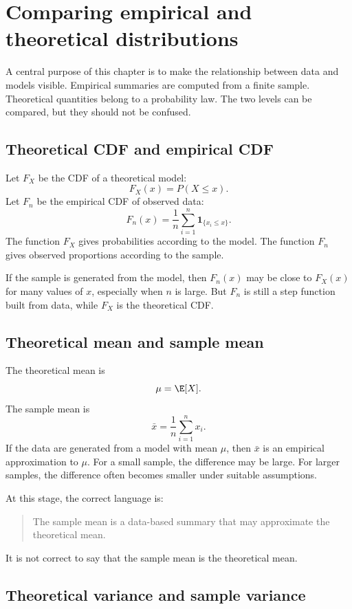 \section{Comparing empirical and theoretical distributions}

A central purpose of this chapter is to make the relationship between data and
models visible. Empirical summaries are computed from a finite sample. Theoretical
quantities belong to a probability law. The two levels can be compared, but they
should not be confused.

\subsection*{Theoretical CDF and empirical CDF}

Let \(F_X\) be the CDF of a theoretical model:
\[
F_X(x)=P(X\leq x).
\]
Let \(F_n\) be the empirical CDF of observed data:
\[
F_n(x)=\frac1n\sum_{i=1}^n\mathbf{1}_{\{x_i\leq x\}}.
\]
The function \(F_X\) gives probabilities according to the model. The function
\(F_n\) gives observed proportions according to the sample.

If the sample is generated from the model, then \(F_n(x)\) may be close to
\(F_X(x)\) for many values of \(x\), especially when \(n\) is large. But \(F_n\) is
still a step function built from data, while \(F_X\) is the theoretical CDF.

\subsection*{Theoretical mean and sample mean}

The theoretical mean is
\[
\mu=\E[X].
\]
The sample mean is
\[
\bar{x}=\frac1n\sum_{i=1}^n x_i.
\]
If the data are generated from a model with mean \(\mu\), then \(\bar{x}\) is an
empirical approximation to \(\mu\). For a small sample, the difference may be
large. For larger samples, the difference often becomes smaller under suitable
assumptions.

At this stage, the correct language is:
\begin{quote}
The sample mean is a data-based summary that may approximate the theoretical
mean.
\end{quote}
It is not correct to say that the sample mean is the theoretical mean.

\subsection*{Theoretical variance and sample variance}

